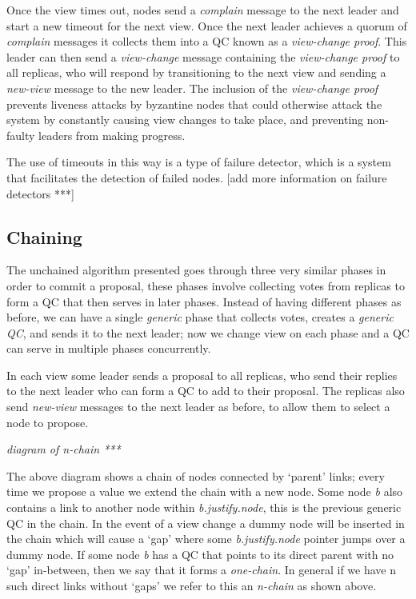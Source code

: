 Once the view times out, nodes send a \textit{complain} message to the next leader and start a new timeout for the next view. Once the next leader achieves a quorum of \textit{complain} messages it collects them into a QC known as a \textit{view-change proof}. This leader can then send a \textit{view-change} message containing the \textit{view-change proof} to all replicas, who will respond by transitioning to the next view and sending a \textit{new-view} message to the new leader. The inclusion of the \textit{view-change proof} prevents liveness attacks by byzantine nodes that could otherwise attack the system by constantly causing view changes to take place, and preventing non-faulty leaders from making progress.

The use of timeouts in this way is a type of failure detector, which is a system that facilitates the detection of failed nodes. [add more information on failure detectors ***]
\subsection{Chaining} \label{chaining}
The unchained algorithm presented goes through three very similar phases in order to commit a proposal, these phases involve collecting votes from replicas to form a QC that then serves in later phases. Instead of having different phases as before, we can have a single \textit{generic} phase that collects votes, creates a \textit{generic QC}, and sends it to the next leader; now we change view on each phase and a QC can serve in multiple phases concurrently.

In each view some leader sends a proposal to all replicas, who send their replies to the next leader who can form a QC to add to their proposal. The replicas also send \textit{new-view} messages to the next leader as before, to allow them to select a node to propose.

\textit{diagram of n-chain ***}

The above diagram shows a chain of nodes connected by `parent' links; every time we propose a value we extend the chain with a new node. Some node \textit{b} also contains a link to another node within \textit{b.justify.node}, this is the previous generic QC in the chain. In the event of a view change a dummy node will be inserted in the chain which will cause a `gap' where some \textit{b.justify.node} pointer jumps over a dummy node. If some node \textit{b} has a QC that points to its direct parent with no `gap' in-between, then we say that it forms a \textit{one-chain}. In general if we have n such direct links without `gaps' we refer to this an \textit{n-chain} as shown above.

